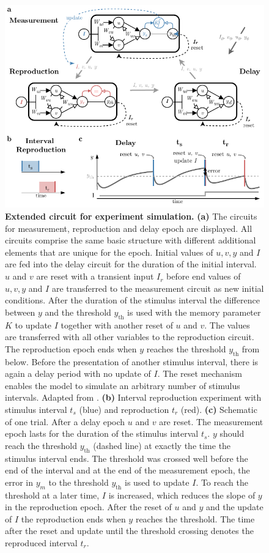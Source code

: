 \documentclass[10pt]{article}
\begin{document}
\begin{figure}
	\centering
	\includegraphics{figures/epochs.pdf}
	\caption{\textbf{Extended circuit for experiment simulation.} 
	\textbf{(a)} The circuits for measurement, reproduction and delay epoch are displayed. All circuits comprise the same basic structure with different additional elements that are unique for the epoch. Initial values of $u, v, y$ and $I$ are fed into the delay circuit for the duration of the initial interval. $u$ and $v$ are reset with a transient input $I_r$ before end values of $u, v, y$ and $I$ are transferred to the measurement circuit as new initial conditions. After the duration of the stimulus interval the difference between $y$ and the threshold $y_{\text{th}}$ is used with the memory parameter $K$ to update $I$ together with another reset of $u$ and $v$. The values are transferred with all other variables to the reproduction circuit. The reproduction epoch ends when $y$ reaches the threshold $y_{\text{th}}$ from below. Before the presentation of another stimulus interval, there is again a delay period with no update of $I$. The reset mechanism enables the model to simulate an arbitrary number of stimulus intervals. Adapted from \cite{Egger2020}.
	\textbf{(b)} Interval reproduction experiment with stimulus interval $t_s$ (blue) and reproduction $t_r$ (red).
	\textbf{(c)} Schematic of one trial. After a delay epoch $u$ and $v$ are reset. The measurement epoch lasts for the duration of the stimulus interval $t_s$. $y$ should reach the threshold $y_{\text{th}}$ (dashed line) at exactly the time the stimulus interval ends. The threshold was crossed well before the end of the interval and at the end of the measurement epoch, the error in $y_m$ to the threshold $y_{\text{th}}$ is used to update $I$. To reach the threshold at a later time, $I$ is increased, which reduces the slope of $y$ in the reproduction epoch. After the reset of $u$ and $y$ and the update of $I$ the reproduction ends when $y$ reaches the threshold. The time after the reset and update until the threshold crossing denotes the reproduced interval $t_r$.}
\label{fig:epochs}
\end{figure}
\end{document}
